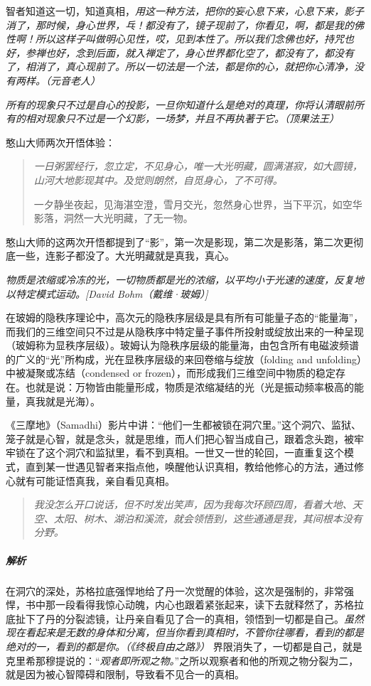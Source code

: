 智者知道这一切，知道真相，\textit{用这一种方法，把你的妄心息下来，心息下来，影子消了，那时候，身心世界，乓！都没有了，镜子现前了，你看见，啊，都是我的佛性啊！所以这样子叫做明心见性，哎，见到本性了。所以我们念佛也好，持咒也好，参禅也好，念到后面，就入禅定了，身心世界都化空了，都没有了，都没有了，相消了，真心现前了。所以一切法是一个法，都是你的心，就把你心清净，没有两样。（元音老人）}

\textit{所有的现象只不过是自心的投影，一旦你知道什么是绝对的真理，你将认清眼前所有的相对现象只不过是一个幻影，一场梦，并且不再执著于它。（顶果法王）}

憨山大师两次开悟体验：

\begin{quotation}\it
    一日粥罢经行，忽立定，不见身心，唯一大光明藏，圆满湛寂，如大圆镜，山河大地影现其中。及觉则朗然，自觅身心，了不可得。

    一夕静坐夜起，见海湛空澄，雪月交光，忽然身心世界，当下平沉，如空华影落，洞然一大光明藏，了无一物。
\end{quotation}

憨山大师的这两次开悟都提到了“影”，第一次是影现，第二次是影落，第二次更彻底一些，连影子都没了。大光明藏就是真我，真心。

\textit{物质是浓缩或冷冻的光，一切物质都是光的浓缩，以平均小于光速的速度，反复地以特定模式运动。[David Bohm（戴维·玻姆）]}

在玻姆的隐秩序理论中，高次元的隐秩序层级是具有所有可能量子态的“能量海”，而我们的三维空间只不过是从隐秩序中特定量子事件所投射或绽放出来的一种呈现（玻姆称为显秩序层级）。玻姆认为隐秩序层级的能量海，由包含所有电磁波频谱的广义的“光”所构成，光在显秩序层级的来回卷缩与绽放（folding and unfolding）中被凝聚或冻结（condensed or frozen），而形成我们三维空间中物质的稳定存在。也就是说：万物皆由能量形成，物质是浓缩凝结的光（光是振动频率极高的能量，真我就是光海）。

《三摩地》（Samadhi）影片中讲：“他们一生都被锁在洞穴里。”这个洞穴、监狱、笼子就是心智，就是念头，就是思维，而人们把心智当成自己，跟着念头跑，被牢牢锁在了这个洞穴和监狱里，看不到真相。一世又一世的轮回，一直重复这个模式，直到某一世遇见智者来指点他，唤醒他认识真相，教给他修心的方法，通过修心就有可能证悟真我，亲自看见真相。

\begin{quote}\it
    我没怎么开口说话，但不时发出笑声，因为我每次环顾四周，看着大地、天空、太阳、树木、湖泊和溪流，就会领悟到，这些通通是我，其间根本没有分野。
\end{quote}

\subparagraph{解析} 在洞穴的深处，苏格拉底强悍地给了丹一次觉醒的体验，这次是强制的，非常强悍，书中那一段看得我惊心动魄，内心也跟着紧张起来，读下去就释然了，苏格拉底扯下了丹的分裂滤镜，让丹亲自看见了合一的真相，领悟到一切都是自己。\textit{虽然现在看起来是无数的身体和分离，但当你看到真相时，不管你往哪看，看到的都是绝对的一，看到的都是你。（《终极自由之路》）} 界限消失了，一切都是自己，就是克里希那穆提说的：“\textit{观者即所观之物。}”之所以观察者和他的所观之物分裂为二，就是因为被心智障碍和限制，导致看不见合一的真相。

